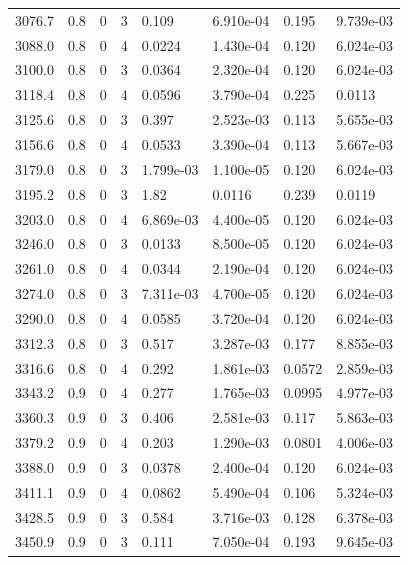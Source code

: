 \documentclass[preview]{standalone}
\begin{document}
{{{{{{\begin{tabular}{L{1.2cm}C{1.2cm} C{0.3cm}C{0.5cm} C{1.4cm}C{1.4cm} C{1.4cm}C{1.4cm}}
  3076.7  &   0.8  & 0     &  3 &  0.109  & 6.910e-04  & 0.195 &  9.739e-03   \\ 
  3088.0  &   0.8  & 0     &  4 &  0.0224  & 1.430e-04  & 0.120 &  6.024e-03   \\ 
  3100.0  &   0.8  & 0     &  3 &  0.0364  & 2.320e-04  & 0.120 &  6.024e-03   \\ 
  3118.4  &   0.8  & 0     &  4 &  0.0596  & 3.790e-04  & 0.225 &  0.0113   \\ 
  3125.6  &   0.8  & 0     &  3 &  0.397  & 2.523e-03  & 0.113 &  5.655e-03   \\ 
  3156.6  &   0.8  & 0     &  4 &  0.0533  & 3.390e-04  & 0.113 &  5.667e-03   \\ 
  3179.0  &   0.8  & 0     &  3 &  1.799e-03  & 1.100e-05  & 0.120 &  6.024e-03   \\ 
  3195.2  &   0.8  & 0     &  3 &  1.82  & 0.0116  & 0.239 &  0.0119   \\ 
  3203.0  &   0.8  & 0     &  4 &  6.869e-03  & 4.400e-05  & 0.120 &  6.024e-03   \\ 
  3246.0  &   0.8  & 0     &  3 &  0.0133  & 8.500e-05  & 0.120 &  6.024e-03   \\ 
  3261.0  &   0.8  & 0     &  4 &  0.0344  & 2.190e-04  & 0.120 &  6.024e-03   \\ 
  3274.0  &   0.8  & 0     &  3 &  7.311e-03  & 4.700e-05  & 0.120 &  6.024e-03   \\ 
  3290.0  &   0.8  & 0     &  4 &  0.0585  & 3.720e-04  & 0.120 &  6.024e-03   \\ 
  3312.3  &   0.8  & 0     &  3 &  0.517  & 3.287e-03  & 0.177 &  8.855e-03   \\ 
  3316.6  &   0.8  & 0     &  4 &  0.292  & 1.861e-03  & 0.0572 &  2.859e-03   \\ 
  3343.2  &   0.9  & 0     &  4 &  0.277  & 1.765e-03  & 0.0995 &  4.977e-03   \\ 
  3360.3  &   0.9  & 0     &  3 &  0.406  & 2.581e-03  & 0.117 &  5.863e-03   \\ 
  3379.2  &   0.9  & 0     &  4 &  0.203  & 1.290e-03  & 0.0801 &  4.006e-03   \\ 
  3388.0  &   0.9  & 0     &  3 &  0.0378  & 2.400e-04  & 0.120 &  6.024e-03   \\ 
  3411.1  &   0.9  & 0     &  4 &  0.0862  & 5.490e-04  & 0.106 &  5.324e-03   \\ 
  3428.5  &   0.9  & 0     &  3 &  0.584  & 3.716e-03  & 0.128 &  6.378e-03   \\ 
  3450.9  &   0.9  & 0     &  3 &  0.111  & 7.050e-04  & 0.193 &  9.645e-03   \\ 

\end{tabular}}}}}}}
\end{document}
